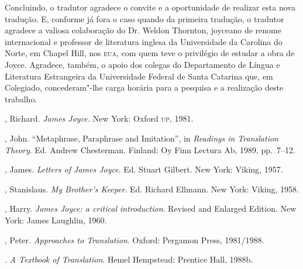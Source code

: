 Concluindo, o tradutor agradece o convite e a oportunidade de
realizar esta nova tradução.  E, conforme já fora o caso quando da primeira
tradução, o tradutor agradece a valiosa colaboração do Dr. Weldon Thornton,
joyceano de renome internacional e professor de literatura inglesa da
Universidade da Carolina do Norte, em Chapel Hill, nos \textsc{eua}, com quem teve o
privilégio de estudar a obra de Joyce.  Agradece, também, o apoio dos colegas
do Departamento de Língua e Literatura Estrangeira da Universidade Federal de
Santa Catarina que, em Colegiado, concederam"-lhe carga horária para a pesquisa
e a realização deste trabalho.

\begin{bibliohedra}
, Richard. \textit{James Joyce.} New York: Oxford \textsc{up},
1981.

, John. “Metaphrase, Paraphrase and Imitation”, in
\textit{Readings in Translation Theory}. Ed. Andrew Chesterman.  Finland: Oy
Finn Lectura Ab, 1989, pp.~7--12.

, James. \textit{Letters of James Joyce}. Ed. Stuart Gilbert. New
York: Viking, 1957.

, Stanislaus. \textit{My Brother’s Keeper}. Ed. Richard Ellmann.
New York: Viking, 1958.

, Harry. \textit{James Joyce: a critical introduction}. Revised
and Enlarged Edition. New York: James Laughlin, 1960.

, Peter. \textit{Approaches to Translation}. Oxford: Pergamon
Press, 1981/1988.

\titidem. \textit{A Textbook of Translation}. Hemel Hempstead: Prentice Hall,
1988b.

\end{bibliohedra}

